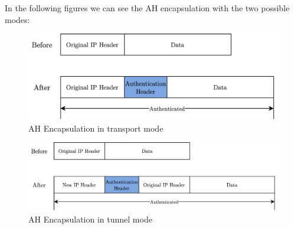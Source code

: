 \documentclass[11pt]{book}
\begin{document}
In the following figures we can see the AH encapsulation with the two possible modes:
\begin{figure}[H]
	\centering
	\includegraphics [scale=0.17] {ah-transport.png}
	\caption{AH Encapsulation in transport mode}
\end{figure}
\begin{figure}[H]
	\centering
	\includegraphics [scale=0.17] {ah-tunnel.png}
	\caption{AH Encapsulation in tunnel mode}
\end{figure}
\end{document}

